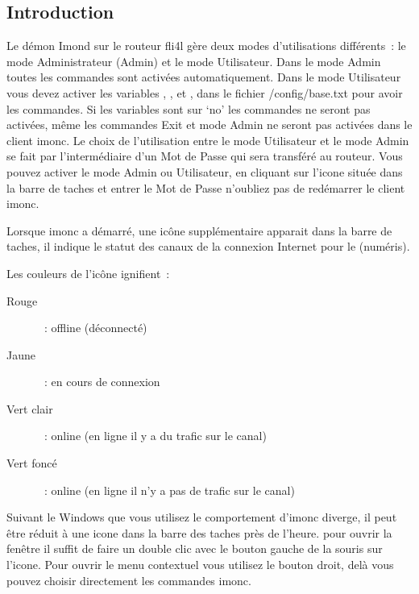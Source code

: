 

  \subsection{Introduction}

  Le démon Imond sur le routeur fli4l gère deux modes d'utilisations différents~:
  le mode Administrateur (Admin) et le mode Utilisateur. Dans le mode Admin
  toutes les commandes sont activées automatiquement. Dans le mode Utilisateur
  vous devez activer les variables ,
  ,  et
  , dans le fichier /config/base.txt pour avoir
  les commandes. Si les variables sont sur `no' les commandes ne seront pas activées,
  même les commandes Exit et mode Admin ne seront pas activées dans le client imonc.
  Le choix de l'utilisation entre le mode Utilisateur et le mode Admin se fait
  par l'intermédiaire d'un Mot de Passe qui sera transféré au routeur. Vous pouvez
  activer le mode Admin ou Utilisateur, en cliquant sur l'icone située dans
  la barre de taches et entrer le Mot de Passe n'oubliez pas de redémarrer
  le client imonc.

  Lorsque imonc a démarré, une icône supplémentaire apparait dans la barre de taches,
  il indique le statut des canaux de la connexion Internet pour le (numéris).

  Les couleurs de l'icône ignifient~:

  \begin{description}
    \item[Rouge]~: offline (déconnecté)
    \item[Jaune]~: en cours de connexion 
    \item[Vert clair]~: online (en ligne il y a du trafic sur le canal)
    \item[Vert foncé]~: online (en ligne il n'y a pas de trafic sur le canal)
  \end{description}

  \noindent Suivant le Windows que vous utilisez le comportement d'imonc diverge,
  il peut être réduit à une icone dans la barre des taches près de l'heure. pour
  ouvrir la fenêtre il suffit de faire un double clic avec le bouton gauche de
  la souris sur l'icone. Pour ouvrir le menu contextuel vous utilisez le bouton
  droit, delà vous pouvez choisir directement les commandes imonc.

